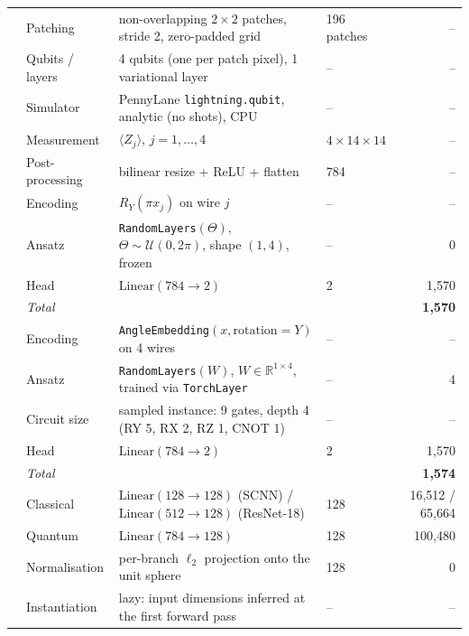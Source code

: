 \begin{table}[t]
\begin{tabular}{@{}llllr@{}}
 & Patching & non-overlapping $2\times2$ patches, stride 2, zero-padded grid & 196 patches & -- \\
 & Qubits / layers & 4 qubits (one per patch pixel), 1 variational layer & -- & -- \\
 & Simulator & PennyLane \texttt{lightning.qubit}, analytic (no shots), CPU & -- & -- \\
 & Measurement & $\langle Z_j\rangle$, $j=1,\dots,4$ & $4\times14\times14$ & -- \\
 & Post-processing & bilinear resize + ReLU + flatten & 784 & -- \\
\cmidrule(l){2-5}
 & Encoding & $R_Y(\pi x_j)$ on wire $j$ & -- & -- \\
 & Ansatz & \texttt{RandomLayers}$(\Theta)$, $\Theta\!\sim\!\mathcal{U}(0,2\pi)$, shape $(1,4)$, frozen & -- & 0 \\
 & Head & $\mathrm{Linear}(784{\to}2)$ & 2 & 1{,}570 \\
 & \textit{Total} & & & \textbf{1{,}570} \\
\cmidrule(l){2-5}
 & Encoding & \texttt{AngleEmbedding}$(x,\text{rotation}{=}Y)$ on 4 wires & -- & -- \\
 & Ansatz & \texttt{RandomLayers}$(W)$, $W\in\mathbb{R}^{1\times4}$, trained via \texttt{TorchLayer} & -- & 4 \\
 & Circuit size & sampled instance: 9 gates, depth 4 (RY 5, RX 2, RZ 1, CNOT 1) & -- & -- \\
 & Head & $\mathrm{Linear}(784{\to}2)$ & 2 & 1{,}570 \\
 & \textit{Total} & & & \textbf{1{,}574} \\
\midrule

 & Classical & $\mathrm{Linear}(128{\to}128)$ (SCNN) / $\mathrm{Linear}(512{\to}128)$ (ResNet-18) & 128 & 16{,}512 / 65{,}664 \\
 & Quantum & $\mathrm{Linear}(784{\to}128)$ & 128 & 100{,}480 \\
 & Normalisation & per-branch $\ell_2$ projection onto the unit sphere & 128 & 0 \\
 & Instantiation & lazy: input dimensions inferred at the first forward pass & -- & -- \\
\midrule


\end{tabular}
\end{table}

